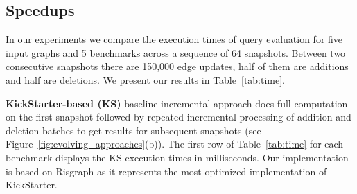 
\vspace{0.05in}
\subsection{Speedups}
    In our experiments we compare the execution times of query evaluation for five input graphs and 5 benchmarks across a sequence of 64 snapshots. Between two consecutive snapshots there are 150,000 edge updates, half of them are additions and half are deletions. 
We present our results in Table~\ref{tab:time}. 

\textbf{KickStarter-based (KS)} baseline incremental approach does full computation on the first snapshot followed by repeated incremental processing of addition and deletion batches to get results for subsequent snapshots (see Figure~\ref{fig:evolving_approaches}(b)). The first row of Table~\ref{tab:time} for each benchmark displays the KS execution times in milliseconds. Our implementation is based on Risgraph as it represents the most optimized implementation of KickStarter.

